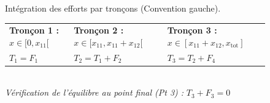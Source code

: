 \documentclass[11pt,a4paper]{article}
\begin{document}
\begin{figure}[H]
    \vspace{0.3cm}
    \begin{tcolorbox}[colback=BoxBg, colframe=gray!50, arc=2pt, boxrule=0.5pt, left=2pt, right=2pt, top=2pt, bottom=2pt]
    \small \centering
    Intégration des efforts par tronçons (Convention gauche).\\
    \begin{tabularx}{\linewidth}{>{\centering\arraybackslash}X >{\centering\arraybackslash}X >{\centering\arraybackslash}X}
        \textbf{Tronçon 1 :} $x \in [0, x_{11}[$ & \textbf{Tronçon 2 :} $x \in [x_{11}, x_{11}+x_{12}[$ & \textbf{Tronçon 3 :} $x \in [x_{11}+x_{12}, x_{\text{tot}}]$ \\
        $T_1 = F_1$ & $T_2 = T_1 + F_2$ & $T_3 = T_2 + F_4$
    \end{tabularx}
    \\[0.1cm] \textit{Vérification de l'équilibre au point final (Pt 3) :} $T_3 + F_3 = 0$
    \end{tcolorbox}
\end{figure}
\end{document}

